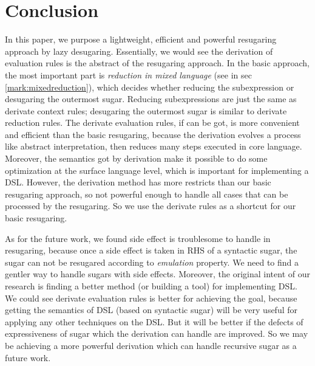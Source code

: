 \section{Conclusion}
\label{sec7}


In this paper, we purpose a lightweight, efficient and powerful resugaring approach by lazy desugaring. Essentially, we would see the derivation of evaluation rules is the abstract of the resugaring approach. In the basic approach, the most important part is \emph{reduction in mixed language} (see in sec \ref{mark:mixedreduction}), which decides whether reducing the subexpression or desugaring the outermost sugar. Reducing subexpressions are just the same as derivate context rules; desugaring the outermost sugar is similar to derivate reduction rules. The derivate evaluation rules, if can be got, is more convenient and efficient than the basic resugaring, because the derivation evolves a process like abstract interpretation\cite{AbstractInterpretation}, then reduces many steps executed in core language. Moreover, the semantics got by derivation make it possible to do some optimization at the surface language level, which is important for implementing a DSL. However, the derivation method has more restricts than our basic resugaring approach, so not powerful enough to handle all cases that can be processed by the resugaring. So we use the derivate rules as a shortcut for our basic resugaring.

As for the future work, we found side effect is troublesome to handle in resugaring, because once a side effect is taken in RHS of a syntactic sugar, the sugar can not be resugared according to \emph{emulation} property. We need to find a gentler way to handle sugars with side effects. Moreover,
the original intent of our research is finding a better method (or building a tool) for implementing DSL. We could see derivate evaluation rules is better for achieving the goal, because getting the semantics of DSL (based on syntactic sugar) will be very useful for applying any other techniques on the DSL. But it will be better if the defects of expressiveness of sugar which the derivation can handle are improved. So we may be achieving a more powerful derivation which can handle recursive sugar as a future work.
